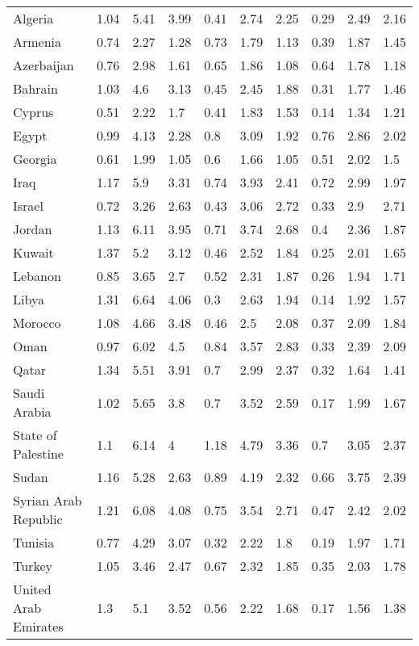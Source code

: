 \begin{longtable}[t]{llllllllll}
Algeria & 1.04 & 5.41 & 3.99 & 0.41 & 2.74 & 2.25 & 0.29 & 2.49 & 2.16\\
Armenia & 0.74 & 2.27 & 1.28 & 0.73 & 1.79 & 1.13 & 0.39 & 1.87 & 1.45\\
Azerbaijan & 0.76 & 2.98 & 1.61 & 0.65 & 1.86 & 1.08 & 0.64 & 1.78 & 1.18\\
Bahrain & 1.03 & 4.6 & 3.13 & 0.45 & 2.45 & 1.88 & 0.31 & 1.77 & 1.46\\
Cyprus & 0.51 & 2.22 & 1.7 & 0.41 & 1.83 & 1.53 & 0.14 & 1.34 & 1.21\\
Egypt & 0.99 & 4.13 & 2.28 & 0.8 & 3.09 & 1.92 & 0.76 & 2.86 & 2.02\\
Georgia & 0.61 & 1.99 & 1.05 & 0.6 & 1.66 & 1.05 & 0.51 & 2.02 & 1.5\\
Iraq & 1.17 & 5.9 & 3.31 & 0.74 & 3.93 & 2.41 & 0.72 & 2.99 & 1.97\\
Israel & 0.72 & 3.26 & 2.63 & 0.43 & 3.06 & 2.72 & 0.33 & 2.9 & 2.71\\
Jordan & 1.13 & 6.11 & 3.95 & 0.71 & 3.74 & 2.68 & 0.4 & 2.36 & 1.87\\
Kuwait & 1.37 & 5.2 & 3.12 & 0.46 & 2.52 & 1.84 & 0.25 & 2.01 & 1.65\\
Lebanon & 0.85 & 3.65 & 2.7 & 0.52 & 2.31 & 1.87 & 0.26 & 1.94 & 1.71\\
Libya & 1.31 & 6.64 & 4.06 & 0.3 & 2.63 & 1.94 & 0.14 & 1.92 & 1.57\\
Morocco & 1.08 & 4.66 & 3.48 & 0.46 & 2.5 & 2.08 & 0.37 & 2.09 & 1.84\\
Oman & 0.97 & 6.02 & 4.5 & 0.84 & 3.57 & 2.83 & 0.33 & 2.39 & 2.09\\
Qatar & 1.34 & 5.51 & 3.91 & 0.7 & 2.99 & 2.37 & 0.32 & 1.64 & 1.41\\
Saudi Arabia & 1.02 & 5.65 & 3.8 & 0.7 & 3.52 & 2.59 & 0.17 & 1.99 & 1.67\\
State of Palestine & 1.1 & 6.14 & 4 & 1.18 & 4.79 & 3.36 & 0.7 & 3.05 & 2.37\\
Sudan & 1.16 & 5.28 & 2.63 & 0.89 & 4.19 & 2.32 & 0.66 & 3.75 & 2.39\\
Syrian Arab Republic & 1.21 & 6.08 & 4.08 & 0.75 & 3.54 & 2.71 & 0.47 & 2.42 & 2.02\\
Tunisia & 0.77 & 4.29 & 3.07 & 0.32 & 2.22 & 1.8 & 0.19 & 1.97 & 1.71\\
Turkey & 1.05 & 3.46 & 2.47 & 0.67 & 2.32 & 1.85 & 0.35 & 2.03 & 1.78\\
United Arab Emirates & 1.3 & 5.1 & 3.52 & 0.56 & 2.22 & 1.68 & 0.17 & 1.56 & 1.38\\

\end{longtable}
